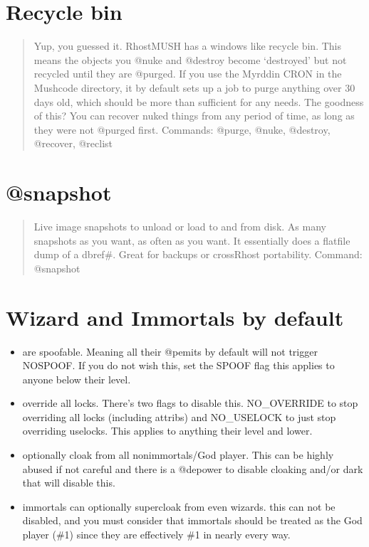 \documentclass[letterpaper,10pt,english]{sphinxmanual}
\begin{document}
\section{Recycle bin}
\label{\detokenize{01-intro:recycle-bin}}\begin{quote}

\sphinxAtStartPar
Yup, you guessed it.  RhostMUSH has a windows like recycle bin.
This means the objects you @nuke and @destroy become ‘destroyed’
but not recycled until they are @purged.  If you use the Myrddin
CRON in the Mushcode directory, it by default sets up a job
to purge anything over 30 days old, which should be more than
sufficient for any needs.  The goodness of this?  You can recover
nuked things from any period of time, as long as they were not
@purged first.
Commands: @purge, @nuke, @destroy, @recover, @reclist
\end{quote}


\section{@snapshot}
\label{\detokenize{01-intro:snapshot}}\begin{quote}

\sphinxAtStartPar
Live image snapshots to unload or load to and from
disk.  As many snapshots as you want, as often as you want.
It essentially does a flatfile dump of a dbref\#.  Great for
backups or cross\sphinxhyphen{}Rhost portability.
Command: @snapshot
\end{quote}


\section{Wizard and Immortals by default}
\label{\detokenize{01-intro:wizard-and-immortals-by-default}}\begin{itemize}
\item {} 
\sphinxAtStartPar
are spoofable.  Meaning all their @pemits by default will not
trigger NOSPOOF.  If you do not wish this, set the SPOOF flag
this applies to anyone below their level.

\item {} 
\sphinxAtStartPar
override all locks.  There’s two flags to disable this.
NO\_OVERRIDE to stop overriding all locks (including attribs)
and NO\_USELOCK to just stop overriding uselocks.
This applies to anything their level and lower.

\item {} 
\sphinxAtStartPar
optionally cloak from all non\sphinxhyphen{}immortals/God player.
This can be highly abused if not careful and there
is a @depower to disable cloaking and/or dark that will
disable this.

\item {} 
\sphinxAtStartPar
immortals can optionally supercloak from even wizards.
this can not be disabled, and you must consider that immortals
should be treated as the God player (\#1) since they are
effectively \#1 in nearly every way.

\end{itemize}
\end{document}
